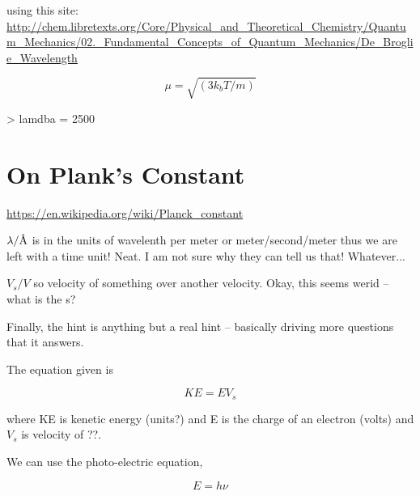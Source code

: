 \documentclass{article}
\newcommand{\angstrom}{\textup{\AA}}
\begin{document}


using this site: \url{http://chem.libretexts.org/Core/Physical_and_Theoretical_Chemistry/Quantum_Mechanics/02._Fundamental_Concepts_of_Quantum_Mechanics/De_Broglie_Wavelength}

\begin{equation}
\mu = \sqrt{(3k_bT/m)}
\end{equation}


\begin{Schunk}
\begin{Sinput}
> lamdba = 2500
\end{Sinput}
\end{Schunk}

\section{On Plank's Constant}

\url{https://en.wikipedia.org/wiki/Planck_constant}



$\lambda/\angstrom$ is in the units of wavelenth per meter or meter/second/meter thus we are left with a time unit! Neat. I am not sure why they can tell us that!  Whatever...

$V_s/V$ so velocity of something over another velocity. Okay, this seems werid -- what is the s?

Finally, the hint is anything but a real hint -- basically driving more questions that it answers. 

The equation given is 

\begin{equation}
KE = EV_s
\end{equation}

\noindent where KE is kenetic energy (units?) and E is the charge of an electron (volts) and $V_s$ is velocity of ??.


We can use the photo-electric equation,

\begin{equation}
E = h\nu
\end{equation}
\end{document}
